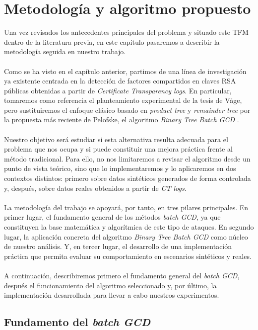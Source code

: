 \chapter{Metodología y algoritmo propuesto}

Una vez revisados los antecedentes principales del problema y situado este TFM dentro de la literatura previa, en este capítulo pasaremos a describir la metodología seguida en nuestro trabajo.
\\
\\
Como se ha visto en el capítulo anterior, partimos de una línea de investigación ya existente centrada en la detección de factores compartidos en claves RSA públicas obtenidas a partir de \textit{Certificate Transparency logs}. En particular, tomaremos como referencia el planteamiento experimental de la tesis de Våge, pero sustituiremos el enfoque clásico basado en \textit{product tree} y \textit{remainder tree} por la propuesta más reciente de Pelofske, el algoritmo \textit{Binary Tree Batch GCD} \cite{vage2022finding,pelofske2024efficient}.
\\
\\
Nuestro objetivo será estudiar si esta alternativa resulta adecuada para el problema que nos ocupa y si puede constituir una mejora práctica frente al método tradicional. Para ello, no nos limitaremos a revisar el algoritmo desde un punto de vista teórico, sino que lo implementaremos y lo aplicaremos en dos contextos distintos: primero sobre datos sintéticos generados de forma controlada y, después, sobre datos reales obtenidos a partir de \textit{CT logs}.
\\
\\
La metodología del trabajo se apoyará, por tanto, en tres pilares principales. En primer lugar, el fundamento general de los métodos \textit{batch GCD}, ya que constituyen la base matemática y algorítmica de este tipo de ataques. En segundo lugar, la aplicación concreta del algoritmo \textit{Binary Tree Batch GCD} como núcleo de nuestro análisis. Y, en tercer lugar, el desarrollo de una implementación práctica que permita evaluar su comportamiento en escenarios sintéticos y reales.
\\
\\
A continuación, describiremos primero el fundamento general del \textit{batch GCD}, después el funcionamiento del algoritmo seleccionado y, por último, la implementación desarrollada para llevar a cabo nuestros experimentos.

\section{Fundamento del \textit{batch GCD}}

